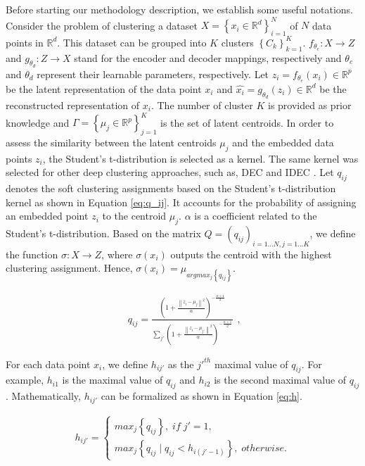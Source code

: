 \documentclass{article}
\begin{document}
Before starting our methodology description, we establish some useful notations.
Consider the problem of clustering a dataset  $ X = \left \{ x_{i} \in \mathbb{R}^{d} \right \}_{i=1}^{N}$ of $N$ data points in $\mathbb{R}^{d}$. This dataset can be grouped into $K$ clusters $\left \{ C_{k} \right \}_{k=1}^{K}$. $f_{\theta_{e}}:X\rightarrow Z$ and  $g_{\theta_{d}}:Z\rightarrow X$ stand for the encoder and decoder mappings, respectively and $\theta_{e}$ and $\theta_{d}$ represent their learnable parameters, respectively. Let $z_{i} = f_{\theta_{e}}(x_{i}) \in \mathbb{R}^{p} $ be the latent representation of the data point $x_{i}$ and $\hat{x_{i}} = g_{\theta_{d}}(z_{i}) \in \mathbb{R}^{d} $ be the reconstructed representation of $x_{i}$. The number of cluster $K$ is provided as prior knowledge and $\Gamma  = \left \{ \mu_{j} \in  \mathbb{R}^{p} \right \}_{j=1}^{K}$ is the set of latent centroids. In order to assess the similarity between the latent centroids $\mu_{j}$ and the embedded data points $z_{i}$, the Student’s t-distribution is selected as a kernel. The same kernel was selected for other deep clustering approaches, such as, DEC \cite{paper27} and IDEC \cite{paper28}. Let $q_{ij}$ denotes the soft clustering assignments based on the Student’s t-distribution kernel as shown in Equation \ref{eq:q_ij}. It accounts for the probability of assigning an embedded point $z_{i}$ to the centroid $\mu_{j}$. $\alpha$ is a coefficient related to the Student’s t-distribution. Based on the matrix $Q = (q_{ij})_{i = 1...N, j = 1...K}$, we define the function $\sigma : X \rightarrow  Z$, where $\sigma(x_{i})$ outputs the centroid with the highest clustering assignment. Hence, $\sigma(x_{i}) = \mu_{argmax_{j}\left \{ q_{ij} \right \}}$.


\begin{equation} \label{eq:q_ij}
  \begin{aligned}
    q_{ij} = \frac{(1 + \frac{\left \| z_{i} - \mu_{j} \right \|^{2}}{\alpha })^{-\frac{\alpha+1}{2}}}{\sum_{j'}(1 + \frac{\left \| z_{i} - \mu_{j'} \right \|^{2}}{\alpha })^{-\frac{\alpha+1}{2}}}
  \end{aligned},
\end{equation}

For each data point $x_{i}$, we define $h_{ij'}$ as the $j'^{th}$ maximal value of $q_{ij}$. For example, $h_{i1}$ is the maximal value of $q_{ij}$ and $h_{i2}$ is the second maximal value of $q_{ij}$. Mathematically, $h_{ij'}$ can be formalized as shown in Equation \ref{eq:h}.

\begin{equation}\label{eq:h}
    \begin{aligned}
    h_{ij'} =\left\{
                \begin{array}{ll}
                  max_{j}\left \{ q_{ij} \right \}, \; if  \;  j'=1,
                  \\
                  max_{j}\left \{ q_{ij} \; | \; q_{ij}<h_{i(j'-1)} \right \},  \; otherwise.
                \end{array}
              \right. 
    \end{aligned}
\end{equation}
\end{document}
